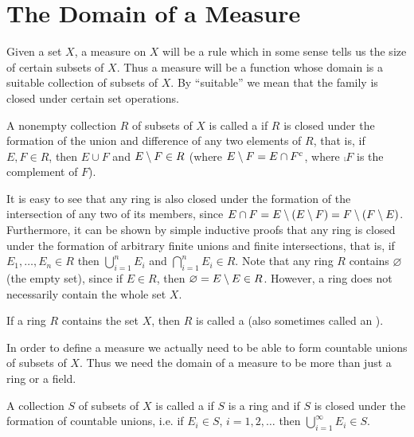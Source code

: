 


\section{The Domain of a Measure}

Given a set $X$, a measure on $X$ will be a rule which in some sense tells us the size of certain subsets of $X$. Thus a measure will be a function whose domain is a suitable collection of subsets of $X$. By ``suitable'' we mean that the family is closed under certain set operations.

\begin{definition}
A nonempty collection $R$ of subsets of $X$ is called a  if $R$ is closed under the formation of the union and difference of any two elements of $R$, that is, if $E,F\in R$, then $E\cup F$ and $E\setminus F\in R$ (where $E\setminus F=E\cap{F}^c$, where $\comp{F}$ is the complement of $F$). 
\end{definition}

It is easy to see that any ring is also closed under the formation of the intersection of any two of its members, since $E\cap F=E\setminus(E\setminus F) = F\setminus (F\setminus E)$. Furthermore, it can be shown by simple inductive proofs that any ring is closed under the formation of arbitrary finite unions and finite intersections, that is, if $E_1,\dots,E_n\in R$ then $\bigcup_{i=1}^nE_i$ and $\bigcap_{i=1}^nE_i\in R$. Note that any ring $R$ contains $\varnothing$ (the empty set), since if $E\in R$, then $\varnothing=E\setminus E\in R$. However, a ring does not necessarily contain the whole set $X$.

\begin{definition}
If a ring $R$ contains the set $X$, then $R$ is called a  (also sometimes called an ).
\end{definition}

In order to define a measure we actually need to be able to form countable unions of subsets of $X$. Thus we need the domain of a measure to be more than just a ring or a field.

\begin{definition}
A collection $S$ of subsets of $X$ is called a  if $S$ is a ring and if $S$ is closed under the formation of countable unions, i.e. if $E_i\in S$, $i=1,2,\dots$ then $\bigcup_{i=1}^\infty E_i\in S$.
\end{definition}

